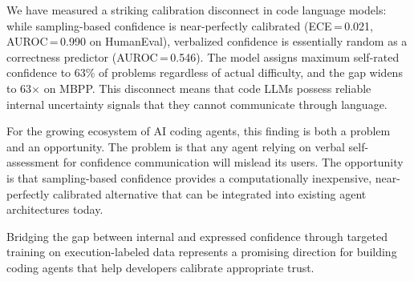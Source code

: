 \documentclass{article}
\begin{document}
We have measured a striking calibration disconnect in code language models: while sampling-based confidence is near-perfectly calibrated (ECE\,=\,0.021, AUROC\,=\,0.990 on HumanEval), verbalized confidence is essentially random as a correctness predictor (AUROC\,=\,0.546). The model assigns maximum self-rated confidence to 63\% of problems regardless of actual difficulty, and the gap widens to 63$\times$ on MBPP. This disconnect means that code LLMs possess reliable internal uncertainty signals that they cannot communicate through language.

For the growing ecosystem of AI coding agents, this finding is both a problem and an opportunity. The problem is that any agent relying on verbal self-assessment for confidence communication will mislead its users. The opportunity is that sampling-based confidence provides a computationally inexpensive, near-perfectly calibrated alternative that can be integrated into existing agent architectures today.

Bridging the gap between internal and expressed confidence through targeted training on execution-labeled data represents a promising direction for building coding agents that help developers calibrate appropriate trust.




\end{document}
